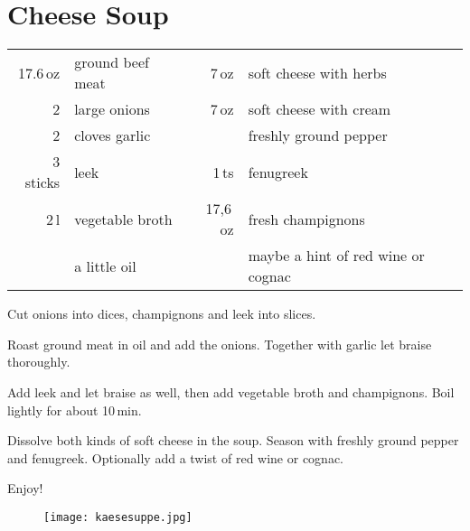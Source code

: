 \section{Cheese Soup}
\begin{centering}

\end{centering}
\begin{table}[H]
\centering
\begin{tabular*}{1\textwidth}{rlrl}
17.6\,oz & ground beef meat & 7\,oz & soft cheese with herbs \\
2 & large onions & 7\,oz & soft cheese with cream \\
2  & cloves garlic & & freshly ground pepper \\
3 sticks & leek &1\,ts& fenugreek \\
2\,l & vegetable broth &17,6\,oz & fresh champignons \\
 & a little oil & & maybe a hint of red wine or cognac\\
\end{tabular*}
\end{table}
\begin{Notes}
\item Cut onions into dices, champignons and leek into slices.
\item Roast ground meat in oil and add the onions. Together with garlic let braise thoroughly.
\item Add leek and let braise as well, then add vegetable broth and champignons. Boil lightly for about 10\,min.
\item Dissolve both kinds of soft cheese in the soup. Season with freshly ground pepper and fenugreek. Optionally add a twist of red wine or cognac.
\end{Notes}
Enjoy!
\vfill
\begin{figure}[H]
  \centering
  \texttt{[image: kaesesuppe.jpg]}
\end{figure}
\newpage
